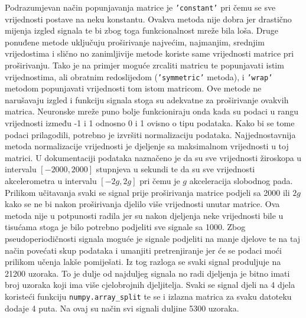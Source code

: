 \documentclass[times, utf8, diplomski]{fer}
\begin{document}
Podrazumjevan način popunjavanja matrice je \texttt{'constant'} pri čemu se sve vrijednosti postave na
neku konstantu. Ovakva metoda nije dobra jer drastično mijenja izgled signala te bi zbog toga funkcionalnost
mreže bila loša. Druge ponuđene metode uključuju proširivanje najvećim, najmanjim, srednjim vrijedostima i
slično no zanimljivije metode koriste same vrijednosti matrice pri proširivanju. Tako je na primjer
moguće zrcaliti matricu te popunjavati istim vrijednostima, ali obratnim redoslijedom (\texttt{'symmetric'} metoda),
i \texttt{'wrap'} metodom popunjavati vrijednosti tom istom matricom. Ove metode ne narušavaju izgled i funkciju signala
stoga su adekvatne za proširivanje ovakvih matrica. Neuronske mreže puno bolje funkcioniraju onda kada su podaci u
rangu vrijednosti između -1 i 1 odnosno 0 i 1 ovisno o tipu podataka. Kako bi se tome podaci prilagodili, potrebno
je izvršiti normalizaciju podataka. Najjednostavnija metoda normalizacije vrijednosti je djeljenje sa maksimalnom
vrijednosti u toj matrici. U dokumentaciji podataka naznačeno je da su sve vrijednosti žiroskopa u intervalu
$[-2000, 2000]$ stupnjeva u sekundi te da su sve vrijednosti akcelerometra u intervalu $[-2g, 2g]$ pri čemu je 
$g$ akceleracija slobodnog pada. Prilikom učitavanja svaki se signal prije proširivanja matrice podjeli sa
2000 ili $2g$ kako se ne bi nakon proširivanja djelilo više vrijednosti unutar matrice. Ova metoda nije u potpunosti
radila jer su nakon djeljenja neke vrijednosti bile u tisućama stoga je bilo potrebno podjeliti sve signale sa
1000. Zbog pseudoperiodičnosti signala moguće je signale podjeliti na manje djelove te na taj način povećati skup
podataka i umanjiti pretrenjiranje jer će se podaci moći prilikom učenja lakše pomiješati. Iz tog razloga se svaki
signal produljuje na 21200 uzoraka. To je dulje od najduljeg signala no radi djeljenja je bitno imati broj uzoraka
koji ima više cjelobrojnih djeljitelja. Svaki se signal djeli na 4 djela koristeći funkciju \texttt{numpy.array\_split}
te se i izlazna matrica za svaku datoteku dodaje 4 puta. Na ovaj su način svi signali duljine 5300 uzoraka. 
\end{document}
